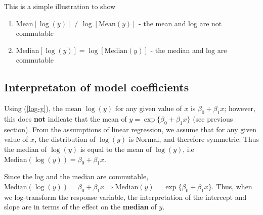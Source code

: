 \documentclass[]{book}
\newenvironment{Shaded}{\begin{snugshade}}{\end{snugshade}}
\newcommand{\KeywordTok}[1]{\textcolor[rgb]{0.13,0.29,0.53}{\textbf{#1}}}
\newcommand{\DataTypeTok}[1]{\textcolor[rgb]{0.13,0.29,0.53}{#1}}
\newcommand{\DecValTok}[1]{\textcolor[rgb]{0.00,0.00,0.81}{#1}}
\newcommand{\StringTok}[1]{\textcolor[rgb]{0.31,0.60,0.02}{#1}}
\newcommand{\OperatorTok}[1]{\textcolor[rgb]{0.81,0.36,0.00}{\textbf{#1}}}
\newcommand{\NormalTok}[1]{#1}
\begin{document}
\begin{Shaded}
\end{Shaded}

This is a simple illustration to show

\begin{enumerate}
\def\labelenumi{\arabic{enumi}.}
\item
  \(\text{Mean}[{\log(y)}] \neq \log[\text{Mean}(y)]\) - the mean and
  log are not commutable
\item
  \(\text{Median}[\log(y)] = \log[\text{Median}(y)]\) - the median and
  log are commutable
\end{enumerate}

\subsection{Interpretaton of model
coefficients}\label{interpretaton-of-model-coefficients}

Using (\ref{log-y}), the mean \(\log(y)\) for any given value of \(x\)
is \(\beta_0 + \beta_1 x\); however, this does \textbf{not} indicate
that the mean of \(y = \exp\{\beta_0 + \beta_1 x\}\) (see previous
section). From the assumptions of linear regression, we assume that for
any given value of \(x\), the distribution of \(\log(y)\) is Normal, and
therefore symmetric. Thus the median of \(\log(y)\) is equal to the mean
of \(\log(y)\), i.e \(\text{Median}(\log(y)) = \beta_0 + \beta_1 x\).

Since the log and the median are commutable,
\(\text{Median}(\log(y)) = \beta_0 + \beta_1 x \Rightarrow \text{Median}(y) = \exp\{\beta_0 + \beta_1 x\}\).
Thus, when we log-transform the response variable, the interpretation of
the intercept and slope are in terms of the effect on the
\textbf{median} of \(y\).
\end{document}
